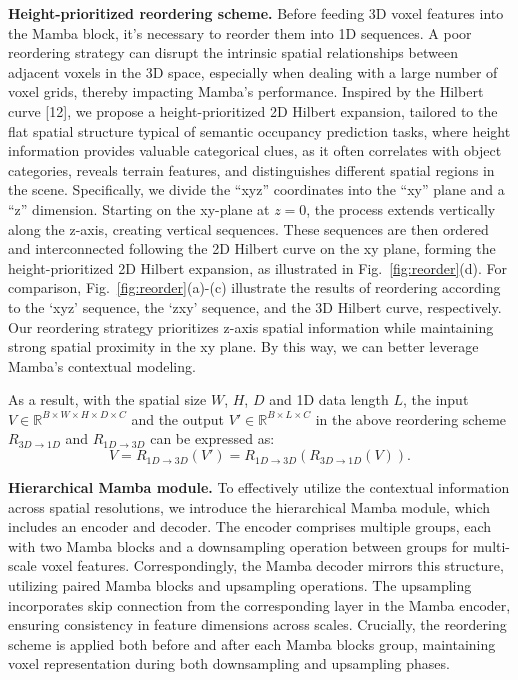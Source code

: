 \documentclass[10pt,twocolumn,letterpaper]{article}
\begin{document}
\textbf{Height-prioritized reordering scheme.}
Before feeding 3D voxel features into the Mamba block, it's necessary to reorder them into 1D sequences. A poor reordering strategy can disrupt the intrinsic spatial relationships between adjacent voxels in the 3D space, especially when dealing with a large number of voxel grids, thereby impacting Mamba's performance. Inspired by the Hilbert curve [12], we propose a height-prioritized 2D Hilbert expansion, tailored to the flat spatial structure typical of semantic occupancy prediction tasks, where height information provides valuable categorical clues, as it often correlates with object categories, reveals terrain features, and distinguishes different spatial regions in the scene. Specifically, we divide the ``xyz'' coordinates into the ``xy'' plane and a ``z'' dimension. Starting on the xy-plane at $z=0$, the process extends vertically along the z-axis, creating vertical sequences. These sequences are then ordered and interconnected following the 2D Hilbert curve on the xy plane, forming the height-prioritized 2D Hilbert expansion, as illustrated in Fig.~\ref{fig:reorder}(d). For comparison, Fig.~\ref{fig:reorder}(a)-(c) illustrate the results of reordering according to the `xyz' sequence, the `zxy' sequence, and the 3D Hilbert curve, respectively. Our reordering strategy prioritizes z-axis spatial information while maintaining strong spatial proximity in the xy plane. By this way, we can better leverage Mamba's contextual modeling.

As a result, with the spatial size $W$, $H$, $D$ and 1D data length $L$, the input $V \in \mathbb{R}^{B \times W \times H \times D \times C}$ and the output $V' \in \mathbb{R}^{B \times L \times C}$ in the above reordering scheme $R_{3D \to 1D}$ and $R_{1D \to 3D}$ can be expressed as:
\begin{equation}
  V = R_{1D \to 3D}(V') = R_{1D \to 3D}(R_{3D \to 1D}(V)). \label{eq:reorder}
\end{equation}

\textbf{Hierarchical Mamba module.}
To effectively utilize the contextual information across spatial resolutions, we introduce the hierarchical Mamba module, which includes an encoder and decoder. The encoder comprises multiple groups, each with two Mamba blocks and a downsampling operation between groups for multi-scale voxel features. Correspondingly, the Mamba decoder mirrors this structure, utilizing paired Mamba blocks and upsampling operations. The upsampling incorporates skip connection from the corresponding layer in the Mamba encoder, ensuring consistency in feature dimensions across scales. Crucially, the reordering scheme is applied both before and after each Mamba blocks group, maintaining voxel representation during both downsampling and upsampling phases.
\end{document}

